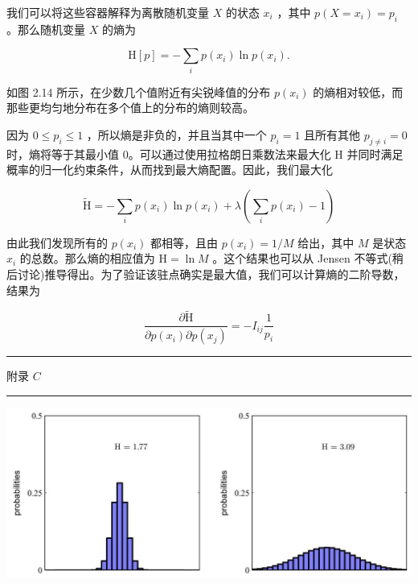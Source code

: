 \documentclass[10pt]{report}
\newcommand{\HRule}{\begin{center}\rule{0.9\linewidth}{0.2mm}\end{center}}
\begin{document}
我们可以将这些容器解释为离散随机变量 \(X\) 的状态 \({x}_{i}\) ，其中 \(p\left( {X = {x}_{i}}\right)  = {p}_{i}\) 。那么随机变量 \(X\) 的熵为

\[
\mathrm{H}\left\lbrack  p\right\rbrack   =  - \mathop{\sum }\limits_{i}p\left( {x}_{i}\right) \ln p\left( {x}_{i}\right) . \tag{2.86}
\]

如图 2.14 所示，在少数几个值附近有尖锐峰值的分布 \(p\left( {x}_{i}\right)\) 的熵相对较低，而那些更均匀地分布在多个值上的分布的熵则较高。

因为 \(0 \leq  {p}_{i} \leq  1\) ，所以熵是非负的，并且当其中一个 \({p}_{i} = 1\) 且所有其他 \({p}_{j \neq  i} = 0\) 时，熵将等于其最小值 0。可以通过使用拉格朗日乘数法来最大化 \(\mathrm{H}\) 并同时满足概率的归一化约束条件，从而找到最大熵配置。因此，我们最大化

\[
\widetilde{\mathrm{H}} =  - \mathop{\sum }\limits_{i}p\left( {x}_{i}\right) \ln p\left( {x}_{i}\right)  + \lambda \left( {\mathop{\sum }\limits_{i}p\left( {x}_{i}\right)  - 1}\right)  \tag{2.87}
\]

由此我们发现所有的 \(p\left( {x}_{i}\right)\) 都相等，且由 \(p\left( {x}_{i}\right)  = 1/M\) 给出，其中 \(M\) 是状态 \({x}_{i}\) 的总数。那么熵的相应值为 \(\mathrm{H} = \ln M\) 。这个结果也可以从 Jensen 不等式(稍后讨论)推导得出。为了验证该驻点确实是最大值，我们可以计算熵的二阶导数，结果为

\[
\frac{\partial \widetilde{\mathrm{H}}}{\partial p\left( {x}_{i}\right) \partial p\left( {x}_{j}\right) } =  - {I}_{ij}\frac{1}{{p}_{i}} \tag{2.88}
\]

\HRule

附录 \(C\)

\HRule

\begin{center}
\includegraphics[max width=1.0\textwidth]{images/0194e279-9b28-703a-88f4-c3ac21e2010d_68_224_402_1306_548_0.jpg}
\end{center}
\hspace*{3em} 
\end{document}
